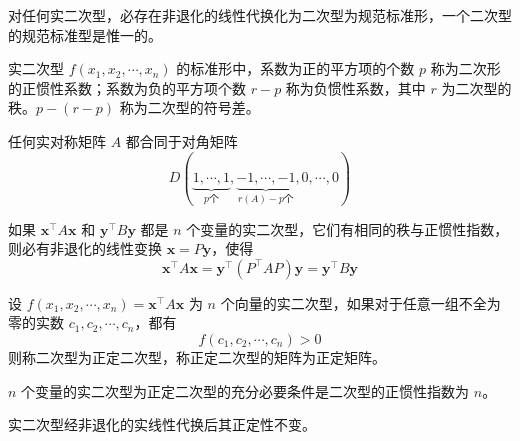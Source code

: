 \documentclass{ctexbook}
\begin{document}
\begin{theorem}[惯性定理]
    对任何实二次型，必存在非退化的线性代换化为二次型为规范标准形，一个二次型的规范标准型是惟一的。
\end{theorem}

\begin{definition}[惯性系数]
    实二次型 $f(x_1,x_2,\cdots,x_n)$ 的标准形中，系数为正的平方项的个数 $p$ 称为二次形的正惯性系数；系数为负的平方项个数 $r-p$ 称为负惯性系数，其中 $r$ 为二次型的秩。$p-(r-p)$ 称为二次型的符号差。
\end{definition}

\begin{corollary}[合同于对角矩阵]
    任何实对称矩阵 $A$ 都合同于对角矩阵
    \begin{equation}
        D(\underbrace{1,\cdots,1}_{p\text{个}},\underbrace{-1,\cdots,-1}_{r(A)-p\text{个}},0,\cdots,0)
    \end{equation}
\end{corollary}

\begin{corollary}[相同秩与正惯性指数]
    如果 $\boldsymbol{x}^\top A\boldsymbol{x}$ 和 $\boldsymbol{y}^\top B\boldsymbol{y}$ 都是 $n$ 个变量的实二次型，它们有相同的秩与正惯性指数，则必有非退化的线性变换 $\boldsymbol{x}=P\boldsymbol{y}$，使得
    \begin{equation}
        \boldsymbol{x}^\top A\boldsymbol{x}=\boldsymbol{y}^\top (P^\top AP)\boldsymbol{y}=\boldsymbol{y}^\top B\boldsymbol{y}
    \end{equation}
\end{corollary}

\begin{definition}[正定二次型]
    设 $f(x_1,x_2,\cdots,x_n)=\boldsymbol{x}^\top A\boldsymbol{x}$ 为 $n$ 个向量的实二次型，如果对于任意一组不全为零的实数 $c_1,c_2,\cdots,c_n$，都有
    \begin{equation}
        f(c_1,c_2,\cdots,c_n)>0
    \end{equation}
    则称二次型为正定二次型，称正定二次型的矩阵为正定矩阵。
\end{definition}

\begin{theorem}[正定二次型正惯性系数判据]
    $n$ 个变量的实二次型为正定二次型的充分必要条件是二次型的正惯性指数为 $n$。
\end{theorem}

\begin{theorem}[正定性不变]
    实二次型经非退化的实线性代换后其正定性不变。
\end{theorem}
\end{document}
